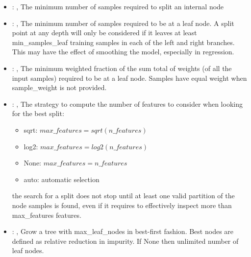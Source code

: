 \begin{itemize}
    \item {}: , 
      The minimum number of samples required to split an internal node

    \item {}: , 
      The minimum number of samples required to be at a leaf node. A split point at any
      depth will only be considered if it leaves at least min\_samples\_leaf training samples in
      each                                                  of the left and right branches. This may
      have the effect of smoothing the model, especially
      in regression.

    \item {}: , 
      The minimum weighted fraction of the sum total of weights (of all the input samples)
      required to be at a leaf node. Samples have equal weight when sample\_weight is not provided.

    \item {}: , 
      The strategy to compute the number of features to consider when looking for the best split:
      \begin{itemize}                                                     \item sqrt:
      $max\_features=sqrt(n\_features)$                                                     \item
      log2: $max\_features=log2(n\_features)$
      \item None: $max\_features=n\_features$
      \item auto: automatic selection
      \end{itemize}                                                   \nb the search for a split
      does not stop until at least one valid partition of the node
      samples is found, even if it requires to effectively inspect more than max\_features features.

    \item {}: , 
      Grow a tree with max\_leaf\_nodes in best-first fashion. Best nodes are defined as relative
      reduction                                                  in impurity. If None then unlimited
      number of leaf nodes.


\end{itemize}
